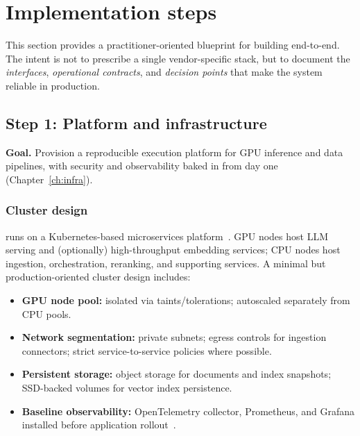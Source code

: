 \section{Implementation steps}
\label{sec:ishtar-implementation-ch12}

This section provides a practitioner-oriented blueprint for building \ishtar{} end-to-end.
The intent is not to prescribe a single vendor-specific stack, but to document the \emph{interfaces}, \emph{operational contracts}, and \emph{decision points} that make the system reliable in production.

\subsection{Step 1: Platform and infrastructure}
\label{sec:ishtar-step-infra}

\textbf{Goal.} Provision a reproducible execution platform for GPU inference and data pipelines, with security and observability baked in from day one (Chapter~\ref{ch:infra}).

\subsubsection{Cluster design}
\ishtar{} runs on a Kubernetes-based microservices platform~\cite{k8s_architecture,k8s_components}.
GPU nodes host LLM serving and (optionally) high-throughput embedding services; CPU nodes host ingestion, orchestration, reranking, and supporting services.
A minimal but production-oriented cluster design includes:
\begin{itemize}
    \item \textbf{GPU node pool:} isolated via taints/tolerations; autoscaled separately from CPU pools.
    \item \textbf{Network segmentation:} private subnets; egress controls for ingestion connectors; strict service-to-service policies where possible.
    \item \textbf{Persistent storage:} object storage for documents and index snapshots; SSD-backed volumes for vector index persistence.
    \item \textbf{Baseline observability:} OpenTelemetry collector, Prometheus, and Grafana installed before application rollout~\cite{prometheus,grafana,otel_spec}.
\end{itemize}

